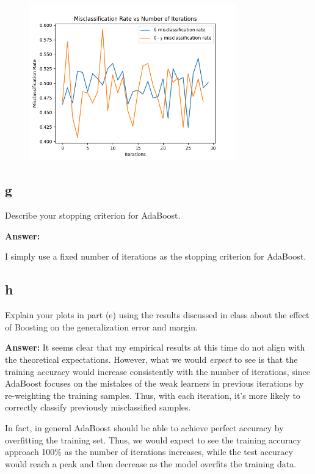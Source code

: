 \documentclass{article}
\begin{document}
\begin{figure}
    \centering
    \includegraphics[width=0.8\textwidth]{images/adaboost_misclassification_rate.png}
    \label{fig:boosting_misclassification_rate}
\end{figure}

\clearpage

\subsection{g}
Describe your stopping criterion for AdaBoost.

\textbf{Answer:}

I simply use a fixed number of iterations as the stopping criterion for AdaBoost.

\subsection{h}
Explain your plots in part (e) using the results discussed in class about the effect of Boosting on the generalization error and margin.

\textbf{Answer:}
It seems clear that my empirical results at this time do not align with the theoretical expectations.
However, what we would \textit{expect} to see is that the training accuracy would increase consistently with the number of iterations, since AdaBoost focuses on the mistakes of the weak learners in previous iterations by re-weighting the training samples.
Thus, with each iteration, it's more likely to correctly classify previously misclassified samples.

In fact, in general AdaBoost should be able to achieve perfect accuracy by overfitting the training set.
Thus, we would expect to see the training accuracy approach 100\% as the number of iterations increases, while the test accuracy would reach a peak and then decrease as the model overfits the training data.
\end{document}
